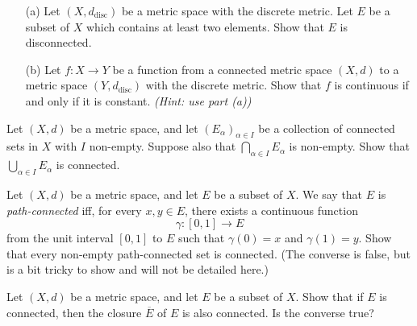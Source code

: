 \begin{problem}[15pts]
      \begin{enumerate}
  \item[(a)] Let $(X,d_{\mathrm{disc}})$ be a metric space with the discrete metric.  
Let $E$ be a subset of $X$ which contains at least two elements.  
Show that $E$ is disconnected.

\medskip
\item[(b)] 
Let $f : X \to Y$ be a function from a connected metric space $(X,d)$ to a metric space $(Y,d_{\mathrm{disc}})$ with the discrete metric.  
Show that $f$ is continuous if and only if it is constant.  
\emph{(Hint: use part (a))}
 
  \end{enumerate}
\end{problem}

\begin{problem}[15pts]
    Let $(X,d)$ be a metric space, and let $(E_\alpha)_{\alpha\in I}$ be a collection of connected sets in $X$ with $I$ non-empty.  
Suppose also that $\bigcap_{\alpha\in I} E_\alpha$ is non-empty.  
Show that $\bigcup_{\alpha\in I} E_\alpha$ is connected.
\end{problem}

\begin{problem}[20pts]
    Let $(X,d)$ be a metric space, and let $E$ be a subset of $X$.  
We say that $E$ is \emph{path-connected} iff, for every $x,y \in E$, there exists a continuous function  
\[
\gamma : [0,1] \to E
\]
from the unit interval $[0,1]$ to $E$ such that $\gamma(0)=x$ and $\gamma(1)=y$.  
Show that every non-empty path-connected set is connected.  
(The converse is false, but is a bit tricky to show and will not be detailed here.)
\end{problem}

\begin{problem}[15pts]
    Let $(X,d)$ be a metric space, and let $E$ be a subset of $X$.  
Show that if $E$ is connected, then the closure $\overline{E}$ of $E$ is also connected.  
Is the converse true?
\end{problem}

